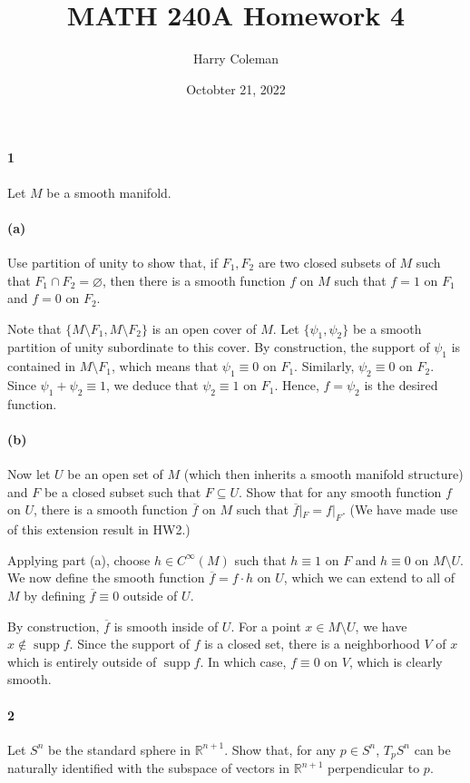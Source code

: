 \documentclass[12pt]{article}
\renewcommand{\maketitle}{\thispagestyle{title}}
\newlength{\myparskip}
\newenvironment{fullbox}{\begin{lrbox}{\savefullbox}\begin{minipage}{\dimexpr\textwidth-2\fboxsep\relax}\setlength{\parskip}{\myparskip}}{\end{minipage}\end{lrbox}\framebox[\textwidth]{\usebox{\savefullbox}}}
\newenvironment{pbox}[1][]{\begin{fullbox}\def\temp{#1}\ifx\temp\empty\else\paragraph{#1}\phantom{}\fi}{\end{fullbox}}
\theoremstyle{definition}
\newcommand{\R}{\mathbb{R}}
\renewcommand{\emptyset}{\varnothing}
\newcommand{\<}{\langle}
\renewcommand{\>}{\rangle}
\DeclareMathOperator{\supp}{supp}
\begin{document}
\title{MATH 240A Homework 4}
\author{Harry Coleman}
\date{Octobter 21, 2022}
\maketitle

\begin{pbox}[1]
    Let $M$ be a smooth manifold.
\end{pbox}

\begin{pbox}[(a)]
    Use partition of unity to show that, if $F_1, F_2$ are two closed subsets of $M$ such that $F_1 \cap F_2 = \emptyset$, then there is a smooth function $f$ on $M$ such that $f=1$ on $F_1$ and $f=0$ on $F_2$.
\end{pbox}

Note that $\{M \setminus F_1, M \setminus F_2\}$ is an open cover of $M$.
Let $\{\psi_1, \psi_2\}$ be a smooth partition of unity subordinate to this cover.
By construction, the support of $\psi_1$ is contained in $M \setminus F_1$, which means that $\psi_1 \equiv 0$ on $F_1$.
Similarly, $\psi_2 \equiv 0$ on $F_2$.
Since $\psi_1 + \psi_2 \equiv 1$, we deduce that $\psi_2 \equiv 1$ on $F_1$.
Hence, $f = \psi_2$ is the desired function.



\begin{pbox}[(b)]
    Now let $U$ be an open set of $M$ (which then inherits a smooth manifold structure) and $F$ be a closed subset such that $F\subseteq U$. Show that for any smooth function $f$ on $U$, there is a smooth function $\overline{f}$ on $M$ such that $\overline{f}|_F = f|_F$. (We have made use of this extension result in HW2.)
\end{pbox}

Applying part (a), choose $h \in C^\infty(M)$ such that $h \equiv 1$ on $F$ and $h \equiv 0$ on $M \setminus U$.
We now define the smooth function $\overline{f} = f \cdot h$ on $U$, which we can extend to all of $M$ by defining $\overline{f} \equiv 0$ outside of $U$.

By construction, $\overline{f}$ is smooth inside of $U$.
For a point $x \in M \setminus U$, we have $x \notin \supp f$.
Since the support of $f$ is a closed set, there is a neighborhood $V$ of $x$ which is entirely outside of $\supp f$.
In which case, $f \equiv 0$ on $V$, which is clearly smooth.




\newpage
\begin{pbox}[2]
    Let $S^n$ be the standard sphere in $\R^{n+1}$. Show that, for any $p\in S^n$, $T_p S^n$ can be naturally identified with the subspace of vectors in $\R^{n+1}$ perpendicular to $p$.
\end{pbox}
\end{document}
